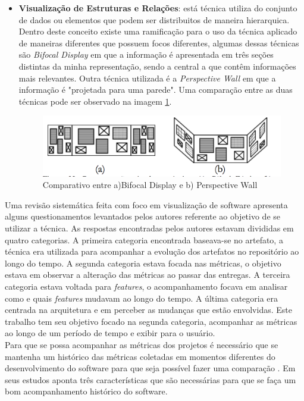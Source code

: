 \begin{itemize}
\item \textbf{Visualização de Estruturas e Relações}: está técnica utiliza do conjunto de dados ou elementos que podem ser distribuitos de maneira hierarquica. Dentro deste conceito existe uma ramificação para o uso da técnica aplicado de maneiras diferentes que possuem focos diferentes, algumas dessas técnicas são \textit{Bifocal Display} em que a informação é apresentada em três seções distintas da minha representação, sendo a central a que contêm informações mais relevantes. Outra técnica utilizada é a \textit{Perspective Wall} em que a informação é "projetada para uma parede". Uma comparação entre as duas técnicas pode ser observado na imagem \ref{img:comparativo}.
\graphicspath{{figuras/}}
\begin{figure}[h]
\centering
\includegraphics[scale=0.5]{Bifocal_Wall}
\caption{Comparativo entre a)Bifocal Display e b) Perspective Wall}
\label{img:comparativo}
\end{figure}
%
\end{itemize}
Uma revisão sistemática feita com foco em visualização de software \cite{salameh_software_2016} apresenta alguns questionamentos levantados pelos autores referente ao objetivo de se utilizar a técnica. As respostas encontradas pelos autores estavam divididas em quatro categorias. A primeira categoria encontrada baseava-se no artefato, a técnica era utilizada para acompanhar a evolução dos artefatos no repositório ao longo do tempo. A segunda categoria estava focada nas métricas, o objetivo estava em observar a alteração das métricas ao passar das entregas. A terceira categoria estava voltada para \textit{features}, o acompanhamento focava em analisar como e quais \textit{features} mudavam ao longo do tempo. A última categoria era centrada na arquitetura e em perceber as mudanças que estão envolvidas. Este trabalho tem seu objetivo focado na segunda categoria, acompanhar as métricas ao longo de um período de tempo e exibir para o usuário.
\\Para que se possa acompanhar as métricas dos projetos é necessário que se mantenha um histórico das métricas coletadas em momentos diferentes do desenvolvimento do software para que seja possível fazer uma comparação \cite{da_silva_iavems:_2010}. Em seus estudos \cite{gracanin_software_2005} aponta três características que são necessárias para que se faça um bom acompanhamento histórico do software.
